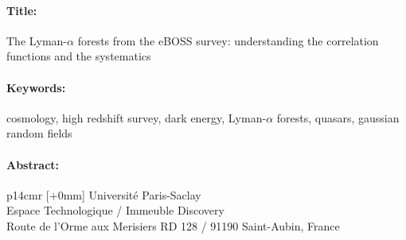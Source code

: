 \newpage
\thispagestyle{empty}
\selectfont
\begin{mdframed}[linecolor=Prune,linewidth=1]
\vspace{-.25cm}
\paragraph*{Title:} The Lyman-$\alpha$ forests from the eBOSS survey: understanding the correlation functions and the systematics

\begin{small}
\vspace{-.25cm}
\paragraph*{Keywords:} cosmology, high redshift survey, dark energy, Lyman-$\alpha$ forests, quasars, gaussian random fields

\vspace{-.5cm}
\begin{multicols}{2}
\paragraph*{Abstract:} \lipsum[1-3]
\end{multicols}
\end{small}
\end{mdframed}

\vspace{3cm} %
\selectfont
\begin{tabular}{p{14cm}r}
[+0mm]{{\color{Prune} Université Paris-Saclay\\
Espace Technologique / Immeuble Discovery\\
  Route de l’Orme aux Merisiers RD 128 / 91190 Saint-Aubin, France}} \\
\end{tabular}
